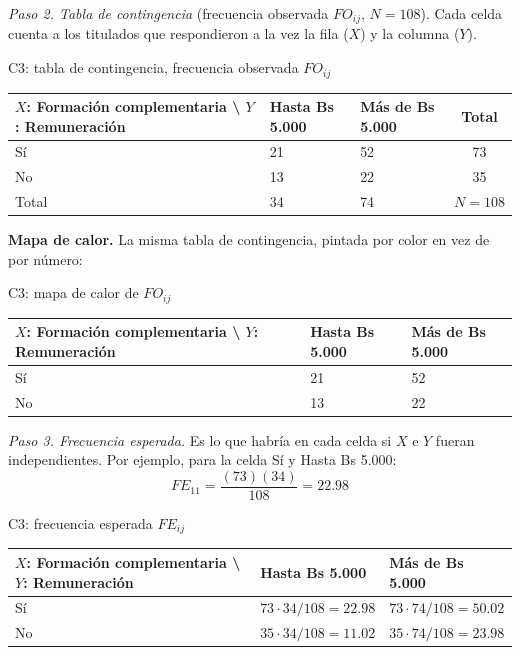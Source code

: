 \textit{Paso 2. Tabla de contingencia} (frecuencia observada $FO_{ij}$, $N = 108$). Cada celda cuenta a los titulados que respondieron a la vez la fila ($X$) y la columna ($Y$).

\begin{mitabla}{C3: tabla de contingencia, frecuencia observada $FO_{ij}$}
\begin{tabular}{L{3.8cm}C{3.00cm}C{3.00cm}|c}
\toprule
$X$: Formación complementaria \textbackslash{} $Y$: Remuneración & Hasta Bs 5.000 & Más de Bs 5.000 & Total \\
\midrule
Sí & 21 & 52 & 73 \\
No & 13 & 22 & 35 \\
\midrule
Total & 34 & 74 & $N = 108$ \\
\bottomrule
\end{tabular}
\end{mitabla}

\textbf{Mapa de calor.} La misma tabla de contingencia, pintada por color en vez de por número:

\begin{mitabla}{C3: mapa de calor de $FO_{ij}$}
\begin{tabular}{L{3.8cm}C{3.00cm}C{3.00cm}}
\toprule
$X$: Formación complementaria \textbackslash{} $Y$: Remuneración & Hasta Bs 5.000 & Más de Bs 5.000 \\
\midrule
Sí & 21 & 52 \\
No & 13 & 22 \\
\bottomrule
\end{tabular}
\end{mitabla}

\textit{Paso 3. Frecuencia esperada.} Es lo que habría en cada celda si $X$ e $Y$ fueran independientes. Por ejemplo, para la celda Sí y Hasta Bs 5.000:
\[
FE_{11} = \frac{(73)(34)}{108} = 22.98
\]

\begin{mitabla}{C3: frecuencia esperada $FE_{ij}$}
\begin{tabular}{L{3.8cm}C{3.00cm}C{3.00cm}}
\toprule
$X$: Formación complementaria \textbackslash{} $Y$: Remuneración & Hasta Bs 5.000 & Más de Bs 5.000 \\
\midrule
Sí & $73\cdot34/108 = 22.98$ & $73\cdot74/108 = 50.02$ \\
No & $35\cdot34/108 = 11.02$ & $35\cdot74/108 = 23.98$ \\
\bottomrule
\end{tabular}
\end{mitabla}

